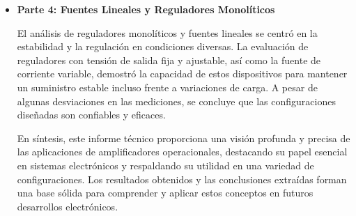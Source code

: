 \begin{itemize}
    \item \textbf{Parte 4: Fuentes Lineales y Reguladores Monolíticos}
    
    El análisis de reguladores monolíticos y fuentes lineales se centró en la estabilidad y la regulación en condiciones diversas. La evaluación de reguladores con tensión de salida fija y ajustable, así como la fuente de corriente variable, demostró la capacidad de estos dispositivos para mantener un suministro estable incluso frente a variaciones de carga. A pesar de algunas desviaciones en las mediciones, se concluye que las configuraciones diseñadas son confiables y eficaces.
    
    En síntesis, este informe técnico proporciona una visión profunda y precisa de las aplicaciones de amplificadores operacionales, destacando su papel esencial en sistemas electrónicos y respaldando su utilidad en una variedad de configuraciones. Los resultados obtenidos y las conclusiones extraídas forman una base sólida para comprender y aplicar estos conceptos en futuros desarrollos electrónicos.
\end{itemize}
\newpage